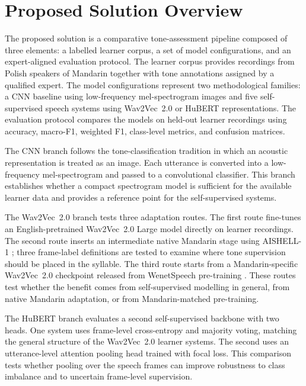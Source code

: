 \section{Proposed Solution Overview}
\label{sec:proposal:overview}

The proposed solution is a comparative tone-assessment pipeline composed of
three elements: a labelled learner corpus, a set of model configurations, and an
expert-aligned evaluation protocol. The learner corpus provides recordings from
Polish speakers of Mandarin together with tone annotations assigned by a
qualified expert. The model configurations represent two methodological
families: a CNN baseline using low-frequency mel-spectrogram images and five
self-supervised speech systems using Wav2Vec~2.0 or HuBERT representations. The
evaluation protocol compares the models on held-out learner recordings using
accuracy, macro-F1, weighted F1, class-level metrics, and confusion matrices.

The CNN branch follows the tone-classification tradition in which an acoustic
representation is treated as an image. Each utterance is converted into a
low-frequency mel-spectrogram and passed to a convolutional classifier. This
branch establishes whether a compact spectrogram model is sufficient for the
available learner data and provides a reference point for the self-supervised
systems.

The Wav2Vec~2.0 branch tests three adaptation routes. The first route fine-tunes
an English-pretrained Wav2Vec~2.0 Large model directly on learner recordings.
The second route inserts an intermediate native Mandarin stage using AISHELL-1
\cite{bu2017aishell}; three frame-label definitions are tested to examine where
tone supervision should be placed in the syllable. The third route starts from a
Mandarin-specific Wav2Vec~2.0 checkpoint released from WenetSpeech pre-training
\cite{zhang2022wenetspeech,tencentgamemate2022}. These routes test whether the
benefit comes from self-supervised modelling in general, from native Mandarin
adaptation, or from Mandarin-matched pre-training.

The HuBERT branch evaluates a second self-supervised backbone with two heads.
One system uses frame-level cross-entropy and majority voting, matching the
general structure of the Wav2Vec~2.0 learner systems. The second uses an
utterance-level attention pooling head trained with focal loss. This comparison
tests whether pooling over the speech frames can improve robustness to class
imbalance and to uncertain frame-level supervision.

